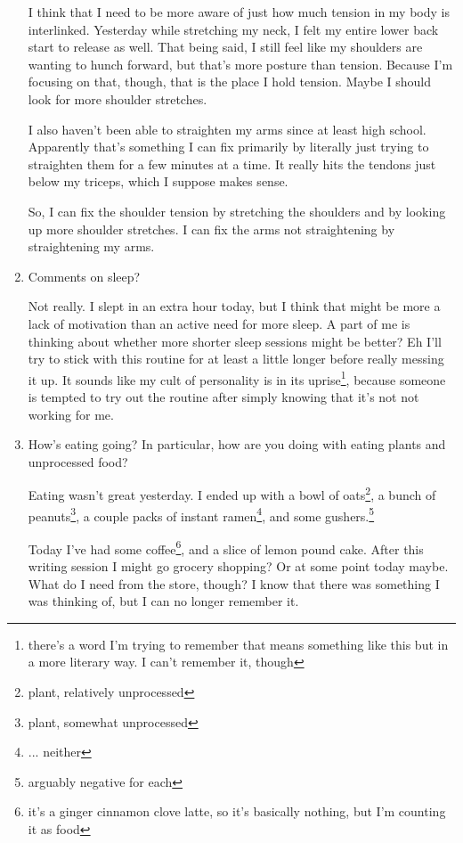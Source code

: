 \documentclass[12pt]{article}
\renewcommand{\,}{\textsuperscript{,}}
\begin{document}
\begin{enumerate}
I think that I need to be more aware of just how much tension in my body is interlinked.  
Yesterday while stretching my neck, I felt my entire lower back start to release as well.  
That being said, I still feel like my shoulders are wanting to hunch forward, but that's more posture than tension.  
Because I'm focusing on that, though, that is the place I hold tension.  
Maybe I should look for more shoulder stretches.

I also haven't been able to straighten my arms since at least high school.  
Apparently that's something I can fix primarily by literally just trying to straighten them for a few minutes at a time.  
It really hits the tendons just below my triceps, which I suppose makes sense.

So, I can fix the shoulder tension by stretching the shoulders and by looking up more shoulder stretches.  
I can fix the arms not straightening by straightening my arms.

\item Comments on sleep?

Not really. I slept in an extra hour today, but I think that might be more a lack of motivation than an active need for more sleep.  
A part of me is thinking about whether more shorter sleep sessions might be better?  
Eh I'll try to stick with this routine for at least a little longer before really messing it up.  
It sounds like my cult of personality is in its uprise\footnote{there's a word I'm trying to remember that means something like this but in a more literary way. I can't remember it, though}, because someone is tempted to try out the routine after simply knowing that it's not not working for me.

\item How's eating going? In particular, how are you doing with eating plants and unprocessed food?

Eating wasn't great yesterday. I ended up with a bowl of oats\footnote{plant, relatively unprocessed}, a bunch of peanuts\footnote{plant, somewhat unprocessed}, a couple packs of instant ramen\footnote{... neither}, and some gushers.\footnote{arguably negative for each}

Today I've had some coffee\footnote{it's a ginger cinnamon clove latte, so it's basically nothing, but I'm counting it as food}, and a slice of lemon pound cake.  
After this writing session I might go grocery shopping? Or at some point today maybe.  
What do I need from the store, though? I know that there was something I was thinking of, but I can no longer remember it.


\end{enumerate}
\end{document}

